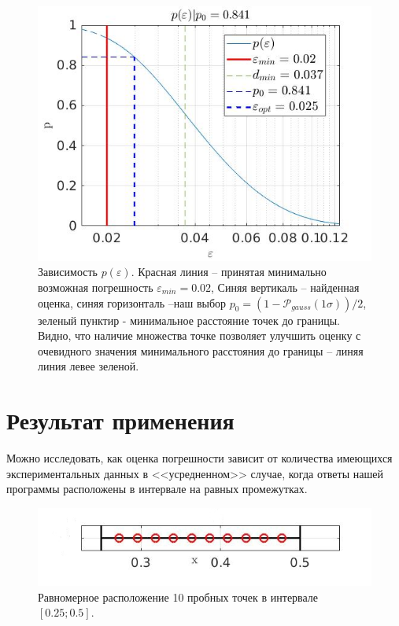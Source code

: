 \documentclass[a4paper,12pt]{article} %
\begin{document}
\begin{figure}[h!]
\begin{center}
\includegraphics[width=1\textwidth]{./pics/vis}
\end{center}
\caption{Зависимость $p(\varepsilon)$. Красная линия -- принятая минимально возможная погрешность $\varepsilon_{min} = 0.02$, Синяя вертикаль -- найденная оценка, синяя горизонталь --наш выбор $p_0 = (1 - \mathcal{P}_{gauss}(1\sigma))/2$, зеленый пунктир - минимальное расстояние точек до границы. Видно, что наличие множества точке позволяет улучшить оценку с очевидного значения минимального расстояния до границы -- линяя линия левее зеленой.} \label{img:vis}
\end{figure}

\section{Результат применения}

Можно исследовать, как оценка погрешности зависит от количества имеющихся экспериментальных данных в <<усредненном>> случае, когда ответы нашей программы расположены в интервале на равных промежутках.

\begin{figure}[h!]
\begin{center}
\includegraphics[width=1\textwidth]{./pics/uni_line}
\end{center}
\caption{Равномерное расположение 10 пробных точек в интервале $[0.25; 0.5]$.} \label{img:uni_line}
\end{figure}
\end{document}
